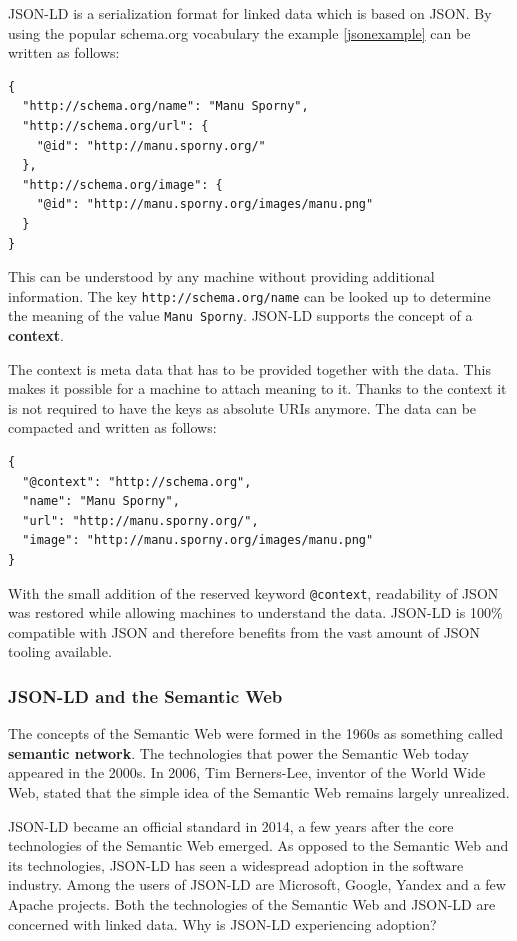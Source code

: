 JSON-LD is a serialization format for linked data which is based on JSON. By using the popular schema.org vocabulary the example \ref{jsonexample} can be written as follows:

\lstset{language=JSON}
\begin{lstlisting}[caption=Data of a person in the JSON-LD format, label=jsonldexample]
{
  "http://schema.org/name": "Manu Sporny",
  "http://schema.org/url": {
    "@id": "http://manu.sporny.org/"
  },
  "http://schema.org/image": {
    "@id": "http://manu.sporny.org/images/manu.png"
  }
}
\end{lstlisting}

This can be understood by any machine without providing additional information. The key \lstinline{http://schema.org/name} can be looked up to determine the meaning of the value \lstinline{Manu Sporny}. JSON-LD supports the concept of a \textbf{context}.

The context is meta data that has to be provided together with the data. This makes it possible for a machine to attach meaning to it. Thanks to the context it is not required to have the keys as absolute URIs anymore. The data can be compacted and written as follows:

\lstset{language=JSON}
\begin{lstlisting}[caption=Compacted data of a person, label=jsonldcompacted]
{
  "@context": "http://schema.org",
  "name": "Manu Sporny",
  "url": "http://manu.sporny.org/",
  "image": "http://manu.sporny.org/images/manu.png"
}
\end{lstlisting}

With the small addition of the reserved keyword \lstinline{@context}, readability of JSON was restored while allowing machines to understand the data. JSON-LD is 100\% compatible with JSON and therefore benefits from the vast amount of JSON tooling available.


\subsubsection{JSON-LD and the Semantic Web}
The concepts of the \gls{Semantic Web} were formed in the 1960s as something called \textbf{semantic network}. The technologies that power the Semantic Web today appeared in the 2000s. In 2006, Tim Berners-Lee, inventor of the World Wide Web, stated that the simple idea of the Semantic Web remains largely unrealized. \citep{semanticwebrevisited}

JSON-LD became an official standard in 2014, a few years after the core technologies of the Semantic Web emerged. As opposed to the Semantic Web and its technologies, JSON-LD has seen a widespread adoption in the software industry. Among the users of JSON-LD are Microsoft, Google, Yandex and a few Apache projects. \citep{jsonldusers} Both the technologies of the Semantic Web and JSON-LD are concerned with linked data. Why is JSON-LD experiencing adoption?

